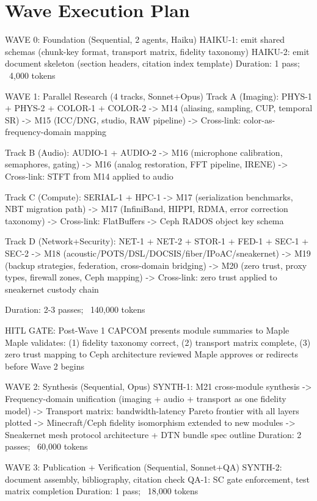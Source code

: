 \documentclass[11pt,letterpaper]{article}
\newenvironment{asciibox}{%
  \begin{tcolorbox}[colback=MidGray!8,colframe=MidGray!40,arc=2pt,left=6pt,right=6pt,top=4pt,bottom=4pt,breakable]
  \ttfamily\small
}{%
  \end{tcolorbox}
}
\begin{document}
\section{Wave Execution Plan}

\begin{asciibox}
WAVE 0: Foundation (Sequential, 2 agents, Haiku)
  HAIKU-1: emit shared schemas (chunk-key format, transport matrix, fidelity taxonomy)
  HAIKU-2: emit document skeleton (section headers, citation index template)
  Duration: 1 pass; ~4,000 tokens

WAVE 1: Parallel Research (4 tracks, Sonnet+Opus)
  Track A (Imaging): PHYS-1 + PHYS-2 + COLOR-1 + COLOR-2
    -> M14 (aliasing, sampling, CUP, temporal SR)
    -> M15 (ICC/DNG, studio, RAW pipeline)
    -> Cross-link: color-as-frequency-domain mapping

  Track B (Audio): AUDIO-1 + AUDIO-2
    -> M16 (microphone calibration, semaphores, gating)
    -> M16 (analog restoration, FFT pipeline, IRENE)
    -> Cross-link: STFT from M14 applied to audio

  Track C (Compute): SERIAL-1 + HPC-1
    -> M17 (serialization benchmarks, NBT migration path)
    -> M17 (InfiniBand, HIPPI, RDMA, error correction taxonomy)
    -> Cross-link: FlatBuffers -> Ceph RADOS object key schema

  Track D (Network+Security): NET-1 + NET-2 + STOR-1 + FED-1 + SEC-1 + SEC-2
    -> M18 (acoustic/POTS/DSL/DOCSIS/fiber/IPoAC/sneakernet)
    -> M19 (backup strategies, federation, cross-domain bridging)
    -> M20 (zero trust, proxy types, firewall zones, Ceph mapping)
    -> Cross-link: zero trust applied to sneakernet custody chain

  Duration: 2-3 passes; ~140,000 tokens

HITL GATE: Post-Wave 1
  CAPCOM presents module summaries to Maple
  Maple validates: (1) fidelity taxonomy correct, (2) transport matrix complete,
    (3) zero trust mapping to Ceph architecture reviewed
  Maple approves or redirects before Wave 2 begins

WAVE 2: Synthesis (Sequential, Opus)
  SYNTH-1: M21 cross-module synthesis
    -> Frequency-domain unification (imaging + audio + transport as one fidelity model)
    -> Transport matrix: bandwidth-latency Pareto frontier with all layers plotted
    -> Minecraft/Ceph fidelity isomorphism extended to new modules
    -> Sneakernet mesh protocol architecture + DTN bundle spec outline
  Duration: 2 passes; ~60,000 tokens

WAVE 3: Publication + Verification (Sequential, Sonnet+QA)
  SYNTH-2: document assembly, bibliography, citation check
  QA-1: SC gate enforcement, test matrix completion
  Duration: 1 pass; ~18,000 tokens
\end{asciibox}
\end{document}
